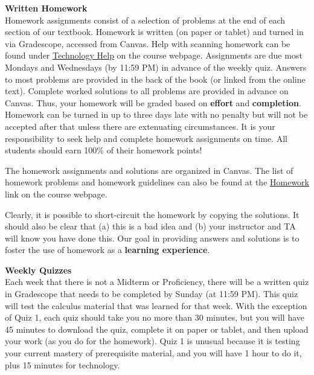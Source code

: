 \documentclass[12pt]{article}
\renewcommand{\emph}[1]{\textsf{\textbf{#1}}}
\newcommand{\localhead}[1]{\par\smallskip\textbf{#1}\nobreak\\}%
\def\heading#1{\localhead{\large\emph{#1}}}
\begin{document}

\heading{Written Homework}
Homework assignments consist of a selection of problems at the end of each section of our textbook. Homework is written (on paper or tablet) and turned in via Gradescope, accessed from Canvas.  Help with scanning homework can be found under \href{https://uaf-math251.github.io/techHelp.html}{Technology Help} on the course webpage. Assignments are due most Mondays and Wednesdays (by 11:59 PM) in advance of the weekly quiz.  Answers to most problems are provided in the back of the book (or linked from the online text). Complete worked solutions to all problems are provided in advance on Canvas. Thus, your homework will be graded based on \emph{effort} and \emph{completion}. Homework can be turned in up to three days late with no penalty but will not be accepted after that unless there are extenuating circumstances. It is your responsibility to seek help and complete homework
assignments on time. All students should earn 100\% of their homework points!

The homework assignments and solutions are organized in Canvas. The list of homework problems and homework guidelines can also be found at the \href{https://uaf-math251.github.io/writtenhomework.html}{Homework} link on the course webpage.

Clearly, it is possible to short-circuit the homework by copying the solutions. It should also be clear that (a) this is a bad idea and (b) your instructor and TA will know you have done this. Our goal in providing answers and solutions is to foster the use of homework as a \emph{learning experience}. 

\heading{Weekly Quizzes}
Each week that there is not a Midterm or Proficiency, there will be a written quiz in Gradescope that needs to be completed by Sunday (at 11:59 PM). This quiz will test the calculus material that was learned for that week. With the exception of Quiz 1, each quiz should take you no more than 30 minutes, but you will have 45 minutes to download the quiz, complete it on paper or tablet, and then upload your work (as you do for the homework). Quiz 1 is unusual because it is testing your current mastery of prerequisite material, and you will have 1 hour to do it, plus 15 minutes for technology.
\end{document}
